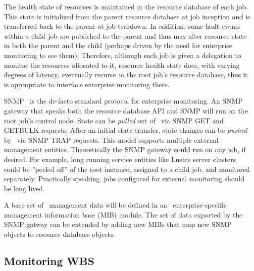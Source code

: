 The health state of resources is maintained in the resource database of
each job.
This state is initialized from the parent resource database at job inception
and is transferred back to the parent at job teardown.
In addition, some fault events within a child job are published
to the parent and thus may alter resource state in both the parent and
the child (perhaps driven by the need for enterprise monitoring to see them).
Therefore, although each job is given a delegation to monitor the resources
allocated to it, resource health state does, with varying degrees of latency,
eventually recurse to the root job's resource database, thus it is
appropriate to interface enterprise monitoring there.

SNMP~\cite{StallingsSNMP} is the de-facto standard protocol for enterprise
monitoring.  An SNMP gateway that speaks both the resource database API
and SNMP will run on the root job's control node.
State can be {\em pulled} out of \ngrm\ via SNMP GET and GETBULK requests.
After an initial state transfer, state changes can be {\em pushed}
by \ngrm\ via SNMP TRAP requests.  This model supports multiple external
management entities.
Theoretically the SNMP gateway could run on any job, if desired.
For example, long running service entities like Lustre server clusters
could be ''peeled off'' of the root instance, assigned to a child job,
and monitored separately.
Practically speaking, jobs configured for external monitoring should be
long lived.

A base set of \ngrm\ management data will be defined in an \ngrm\ 
enterprise-specific management information base (MIB) module.
The set of data exported by the SNMP gatway can be extended by adding
new MIBs that map new SNMP objects to resource database objects.

\ifwbs
\subsection{Monitoring WBS}

